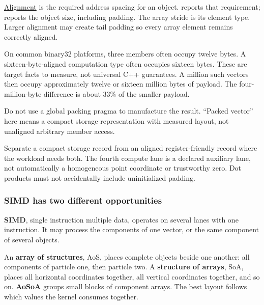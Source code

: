 \hyperref[02-foundations-ii-ch037-storage-and-computation-can-choose-different-layouts]{Alignment} is the required address spacing for an object.  reports that requirement;  reports the object size, including padding. The array stride is  its element type. Larger alignment may create tail padding so every array element remains correctly aligned.

On common binary32 platforms, three  members often occupy twelve bytes. A sixteen-byte-aligned computation type often occupies sixteen bytes. These are target facts to measure, not universal C++ guarantees. A million such vectors then occupy approximately twelve or sixteen million bytes of payload. The four-million-byte difference is about \(33\%\) of the smaller payload.

Do not use a global packing pragma to manufacture the result. ``Packed vector'' here means a compact storage representation with measured layout, not unaligned arbitrary member access.

Separate a compact storage record from an aligned register-friendly record where the workload needs both. The fourth compute lane is a declared auxiliary lane, not automatically a homogeneous point coordinate or trustworthy zero. Dot products must not accidentally include uninitialized padding.

\subsubsection{SIMD has two different opportunities}\label{02-foundations-ii-ch037-simd-has-two-different-opportunities}

\hypertarget{02-foundations-ii-ch037-simd-has-two-different-opportunities}{}

\textbf{SIMD}, single instruction multiple data, operates on several lanes with one instruction. It may process the components of one vector, or the same component of several objects.

An \textbf{array of structures}, AoS, places complete objects beside one another: all components of particle one, then particle two. A \textbf{structure of arrays}, SoA, places all horizontal coordinates together, all vertical coordinates together, and so on. \textbf{AoSoA} groups small blocks of component arrays. The best layout follows which values the kernel consumes together.

